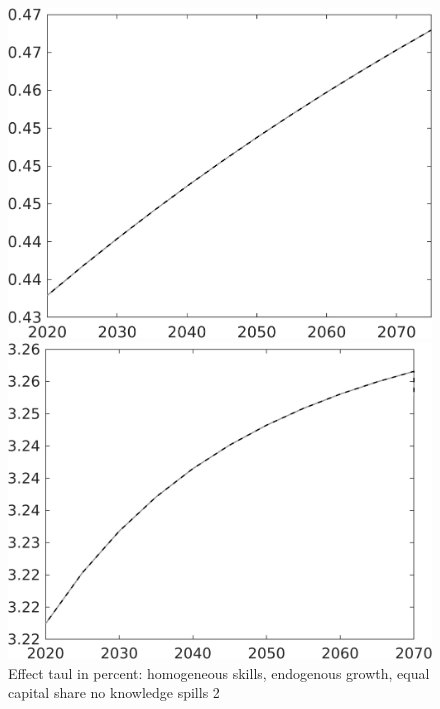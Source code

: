 \documentclass[12pt]{article}
\begin{document}
\begin{figure}[h!!]
	\centering
	\caption{Effect taul in percent: homogeneous skills, endogenous growth, equal capital share no knowledge spills 2}\label{fig:LF_BAU_nsk1_xgr0_equalcapShare_noknow2}
	
	\begin{minipage}[]{0.32\textwidth}
		\includegraphics[width=1\textwidth]{../../codding_model/own_basedOnFried/optimalPol_010922_revision/figures/all_13Sept22/CompTaul_Equlab_LFBAU_Reg0_EY_spillover0_nsk1_xgr0_knspil1_sep1_countec0_GovRev0_etaa0.79_lgd0.png}
	\end{minipage}	
	\begin{minipage}[]{0.32\textwidth}
		\includegraphics[width=1\textwidth]{../../codding_model/own_basedOnFried/optimalPol_010922_revision/figures/all_13Sept22/CompTaul_Equlab_LFBAU_Reg0_gAn_spillover0_nsk1_xgr0_knspil1_sep1_countec0_GovRev0_etaa0.79_lgd0.png}

\end{minipage}
\end{figure}
\end{document}
